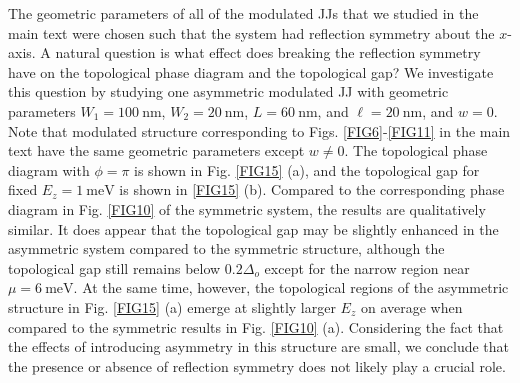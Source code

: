 \documentclass[twocolumn,aps,prb,nofootinbib]{revtex4-2}
\begin{document}
The geometric parameters of all of the modulated JJs that we studied in the main text were chosen such that the system had reflection symmetry about the $x$-axis. A natural question is what effect does breaking the reflection symmetry have on the topological phase diagram and the topological gap? We investigate this question by studying one asymmetric modulated JJ with geometric parameters $W_1 = 100~\text{nm}$, $W_2 = 20~\text{nm}$, $L = 60~\text{nm}$, and $\ell = 20~\text{nm}$, and $w = 0$. Note that modulated structure corresponding to Figs. \ref{FIG6}-\ref{FIG11} in the main text have the same geometric parameters except $w \neq 0$. The topological phase diagram with $\phi = \pi$ is shown in Fig. \ref{FIG15} (a), and the topological gap for fixed $E_z = 1~\text{meV}$ is shown in \ref{FIG15} (b). Compared to the corresponding phase diagram in Fig. \ref{FIG10} of the symmetric system, the results are qualitatively similar. It does appear that the topological gap may be slightly enhanced in the asymmetric system compared to the symmetric structure, although the topological gap still remains below $0.2\Delta_o$ except for the narrow region near $\mu = 6~\text{meV}$. At the same time, however, the topological regions of the asymmetric structure in Fig. \ref{FIG15} (a) emerge at slightly larger $E_z$ on average when compared to the symmetric results in Fig. \ref{FIG10} (a). Considering the fact that the effects of introducing asymmetry in this structure are small, we conclude that the presence or absence of reflection symmetry does not likely play a crucial role.  

\vspace{7cm} %

\end{document}
